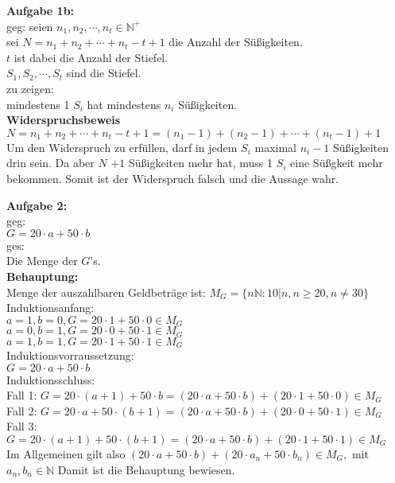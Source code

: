 \documentclass[a4paper]{scrartcl}
\begin{document}
	\begin{flushleft}
		\textbf{Aufgabe 1b:}\\
		geg: 
		seien $n_1,n_2,\cdots,n_t\in\mathbb{N}^+$\\
		sei $N = n_1+n_2+\cdots+n_t-t+1$ die Anzahl der Süßigkeiten.\\
		$t$ ist dabei die Anzahl der Stiefel.\\
		$S_1,S_2,\cdots,S_t$ sind die Stiefel.\\ [1em]
		zu zeigen:\\
		mindestens 1 $S_i$ hat mindestens $n_i$ Süßigkeiten.\\
		\textbf{Widerspruchsbeweis}\\
		$N = n_1+n_2+\cdots+n_t-t+1 = (n_1-1)+(n_2-1)+\cdots+(n_t-1)+1$\\
		Um den Widerspruch zu erfüllen, darf in jedem $S_i$ maximal $n_i-1$ Süßigkeiten drin sein. Da aber $N$ $+1$ Süßigkeiten mehr hat, muss 1 $S_i$ eine Süßgkeit mehr bekommen. Somit ist der Widerspruch falsch und die Aussage wahr.\\[1em]
	\end{flushleft}
	\begin{flushleft}
		\textbf{Aufgabe 2:}\\
		geg:\\
		$G = 20\cdot a + 50\cdot b$\\
		ges:\\
		Die Menge der $G$'s.\\
		\textbf{Behauptung:}\\
		Menge der auszahlbaren Geldbeträge ist: $M_G=\{n\mathbb{N}:10|n,n\geq 20,n \neq 30\}$\\[1em]
		Induktionsanfang:\\
		$a=1,b=0, G=20\cdot 1 + 50\cdot 0 \in M_G$\\
		$a=0,b=1, G=20\cdot 0 + 50\cdot 1 \in M_G$\\
		$a=1,b=1, G=20\cdot 1 + 50\cdot 1 \in M_G$\\
		Induktionsvorraussetzung:\\
		$G = 20\cdot a + 50\cdot b$\\
		Induktionsschluss:\\
		Fall 1: $G = 20\cdot (a + 1) + 50\cdot b = (20\cdot a + 50\cdot b) + (20\cdot 1 + 50\cdot 0) \in M_G$\\
		Fall 2: $G = 20\cdot a + 50\cdot (b + 1) = (20\cdot a + 50\cdot b) + (20\cdot 0 + 50\cdot 1) \in M_G$\\
		Fall 3: $G = 20\cdot (a + 1) + 50\cdot (b + 1) = (20\cdot a + 50\cdot b) + (20\cdot 1 + 50\cdot 1) \in M_G$\\[1em]
		Im Allgemeinen gilt also $(20\cdot a + 50\cdot b) + (20\cdot a_n + 50\cdot b_n) \in M_G,$ mit $a_n,b_n\in \mathbb{N}$
		Damit ist die Behauptung bewiesen.\\[1em]
	\end{flushleft}
\end{document}
